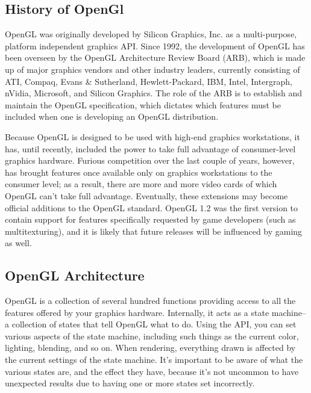\documentclass[12pt]{report}
\begin{document}
\subsection{History of OpenGl}
OpenGL was originally developed by Silicon Graphics, Inc. as a multi-purpose, platform independent graphics API. Since 1992, the development of OpenGL has been overseen by the OpenGL Architecture Review Board (ARB), which is made up of major graphics vendors and other industry leaders, currently consisting of ATI, Compaq, Evans \& Sutherland, Hewlett-Packard, IBM, Intel, Intergraph, nVidia, Microsoft, and Silicon Graphics. The role of the ARB is to establish and maintain the OpenGL specification, which dictates which features must be included when one is developing an OpenGL distribution.



Because OpenGL is designed to be used with high-end graphics workstations, it has, until recently, included the power to take full advantage of consumer-level graphics hardware. Furious competition over the last couple of years, however, has brought features once available only on graphics workstations to the consumer level; as a result, there are more and more video cards of which OpenGL can't take full advantage. Eventually, these extensions may become official additions to the OpenGL standard. OpenGL 1.2 was the first version to contain support for features specifically requested by game developers (such as multitexturing), and it is likely that future releases will be influenced by gaming as well.


\subsection{OpenGL Architecture}

OpenGL is a collection of several hundred functions providing access to all the features offered by your graphics hardware. Internally, it acts as a state machine--a collection of states that tell OpenGL what to do. Using the API, you can set various aspects of the state machine, including such things as the current color, lighting, blending, and so on. When rendering, everything drawn is affected by the current settings of the state machine. It's important to be aware of what the various states are, and the effect they have, because it's not uncommon to have unexpected results due to having one or more states set incorrectly.
\end{document}

